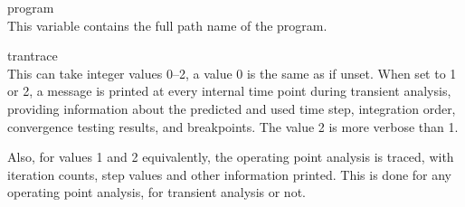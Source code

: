 \begin{description}
\item{\et program}\\
This variable contains the full path name of the program.

\item{\et trantrace}\\
This can take integer values 0--2, a value 0 is the same as if unset. 
When set to 1 or 2, a message is printed at every internal time point
during transient analysis, providing information about the predicted
and used time step, integration order, convergence testing results,
and breakpoints.  The value 2 is more verbose than 1.

Also, for values 1 and 2 equivalently, the operating point analysis is
traced, with iteration counts, step values and other information
printed.  This is done for any operating point analysis, for transient
analysis or not.
\end{description}

